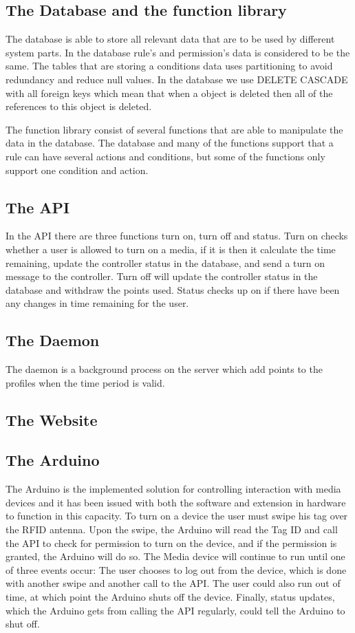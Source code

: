 \subsection*{The Database and the function library}
The database is able to store all relevant data that are to be used by different system parts. In the database rule's and permission's data is considered to be the same. The tables that are storing a conditions data uses partitioning to avoid redundancy and reduce null values. In the database we use DELETE CASCADE with all foreign keys which mean that when a object is deleted then all of the references to this object is deleted.

The function library consist of several functions that are able to manipulate the data in the database. The database and many of the functions support that a rule can have several actions and conditions, but some of the functions only support one condition and action.
 
\subsection*{The API}
In the API there are three functions turn on, turn off and status. Turn on checks whether a user is allowed to turn on a media, if it is then it calculate the time remaining, update the controller status in the database, and send a turn on message to the controller. Turn off will update the controller status in the database and withdraw the points used. Status checks up on if there have been any changes in time remaining for the user.

\subsection*{The Daemon}
The daemon is a background process on the server which add points to the profiles when the time period is valid. 

\subsection*{The Website}


\subsection*{The Arduino}
The Arduino is the implemented solution for controlling interaction with media devices and it has been issued with both the software and extension in hardware to function in this capacity.
To turn on a device the user must swipe his tag over the RFID antenna.
Upon the swipe, the Arduino will read the Tag ID and call the API to check for permission to turn on the device, and if the permission is granted, the Arduino will do so.
The Media device will continue to run until one of three events occur: The user chooses to log out from the device, which is done with another swipe and another call to the API. The user could also run out of time, at which point the Arduino shuts off the device. Finally, status updates, which the Arduino gets from calling the API regularly, could tell the Arduino to shut off.